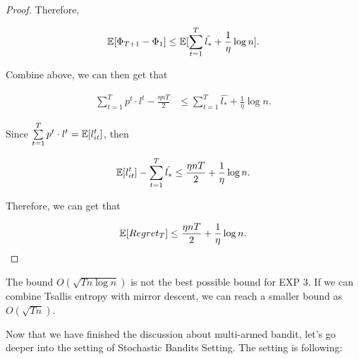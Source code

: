 \documentclass[../main.tex]{subfiles}
\begin{document}
\begin{proof}
	Therefore, 
	
	\begin{equation*}
		\mathbb{E} [\Phi_{T+1} - \Phi_1] \leq \mathbb{E} [\sum\limits_{t=1}^T\hat{l_*} + \frac{1}{\eta} \log n].
	\end{equation*}
	
	Combine above, we can then get that 
	
	\begin{equation*}
		\begin{aligned}
			\sum\limits_{t=1}^T p^t \cdot l^t -  \frac{\eta n T }{2}  & \leq \sum\limits_{t=1}^T\hat{l_*} + \frac{1}{\eta} \log n .
		\end{aligned}
	\end{equation*}
	
	Since $\sum\limits_{t=1}^T p^t \cdot l^t = \mathbb{E}[l_{it}^t]$, then
	
	\begin{equation*}
		\begin{aligned}
			\mathbb{E}[l_{it}^t] - \sum\limits_{t=1}^T\hat{l_*} \leq   \frac{\eta n T}{2}   + \frac{1}{\eta} \log n .
		\end{aligned}
	\end{equation*}
	
	Therefore, we can get that 
	
	\begin{equation*}
		\begin{aligned}
			\mathbb{E}[Regret_T] \leq   \frac{\eta n T }{2}   + \frac{1}{\eta} \log n .
		\end{aligned}
	\end{equation*}
	
\end{proof} 

\begin{remark}
	The bound $O(\sqrt{T n\log n})$ is not the best possible bound for EXP 3. If we can combine Tsallis entropy with mirror descent, we can reach a smaller bound as $O(\sqrt{Tn})$.
\end{remark}

Now that we have finished the discussion about multi-armed bandit, let's go deeper into the setting of Stochastic Bandits Setting. The setting is following:
\end{document}
